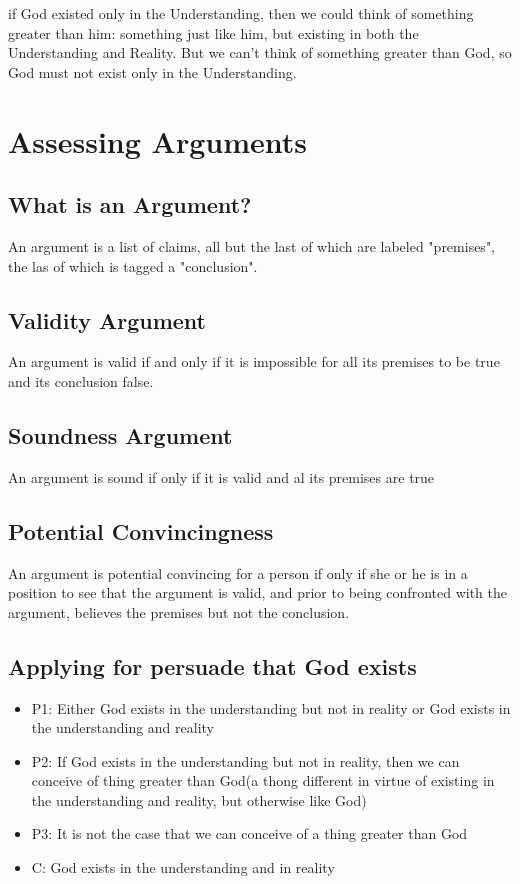 \documentclass{book}
\begin{document}
if God existed only in the Understanding, then we could think of something greater than him: something just like him, but existing in both the Understanding and Reality. But we can't think of something greater than God, so God must not exist only in the Understanding.

\pagebreak


\section{Assessing Arguments}

\subsection{What is an Argument?}
An argument is a list of claims, all but the last of which are labeled "premises", the las of which is tagged a "conclusion".

\subsection{Validity Argument}
An argument is valid if and only if it is impossible for all its premises to be true and its conclusion false.


\subsection{Soundness Argument}
An argument is sound if only if it is valid and al its premises are true

\subsection{Potential Convincingness}
An argument is potential convincing for a person if only if she or he is in a position to see that the argument is valid, and prior to being confronted with the argument, believes the premises but not the conclusion.

\subsection{Applying for persuade that God exists}
\begin{itemize}
\item{P1: Either God exists in the understanding but not in reality or God exists in the understanding and reality}
\item{P2: If God exists in the understanding but not in reality, then we can conceive of thing greater than God(a thong different in virtue of existing in the understanding and reality, but otherwise like God)}
\item{P3: It is not the case that we can conceive of a thing greater than God}

\item{C: God exists in the understanding and in reality}
\end{itemize}
\end{document}
